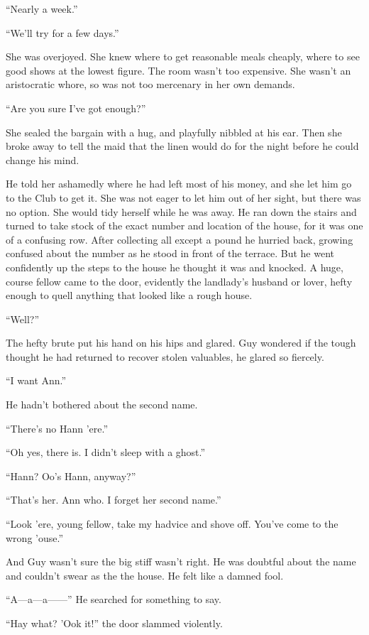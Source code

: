 ``Nearly a week.''

``We'll try for a few days.''

She was overjoyed. She knew where to get reasonable meals cheaply, where to see good shows at the lowest figure. The room wasn't too expensive. She wasn't an aristocratic whore, so was not too mercenary in her own demands.

``Are you sure I've got enough?''

She sealed the bargain with a hug, and playfully nibbled at his ear. Then she broke away to tell the maid that the linen would do for the night before he could change his mind.

He told her ashamedly where he had left most of his money, and she let him go to the Club to get it. She was not eager to let him out of her sight, but there was no option. She would tidy herself while he was away. He ran down the stairs and turned to take stock of the exact number and location of the house, for it was one of a confusing row. After collecting all except a pound he hurried back, growing confused about the number as he stood in front of the terrace. But he went confidently up the steps to the house he thought it was and knocked. A huge, course fellow came to the door, evidently the landlady's husband or lover, hefty enough to quell anything that looked like a rough house.

``Well?''

The hefty brute put his hand on his hips and glared. Guy wondered if the tough thought he had returned to recover stolen valuables, he glared so fiercely.

``I want Ann.''

He hadn't bothered about the second name.

``There's no Hann 'ere.''

``Oh yes, there is. I didn't sleep with a ghost.''

``Hann? Oo's Hann, anyway?''

``That's her. Ann who. I forget her second name.''

``Look 'ere, young fellow, take my hadvice and shove off. You've come to the wrong 'ouse.''

And Guy wasn't sure the big stiff wasn't right. He was doubtful about the name and couldn't swear as the the house. He felt like a damned fool.

``A---a---a------'' He searched for something to say.

``Hay what? 'Ook it!'' the door slammed violently.

